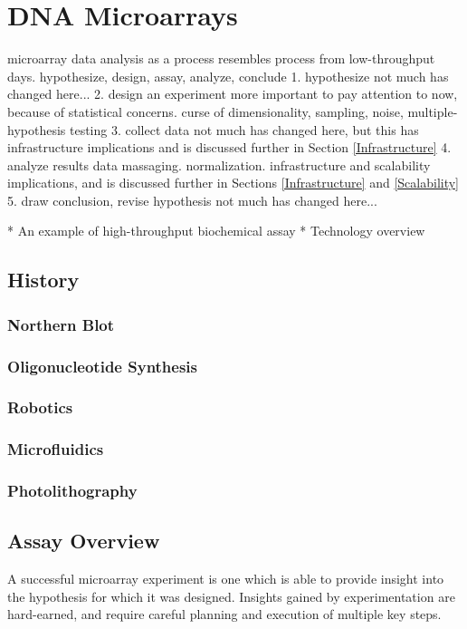 \section{DNA Microarrays}
\label{DNA Microarrays}

\newcommand{\mage}{PMID_12225585}
\newcommand{\mo}{PMID_12225585}

microarray data analysis as a process
resembles process from low-throughput days.  hypothesize, design, assay, analyze, conclude
  1. hypothesize
     not much has changed here...
  2. design an experiment
     more important to pay attention to now, because of statistical concerns.  curse of dimensionality, sampling, noise, multiple-hypothesis testing
  3. collect data
     not much has changed here, but this has infrastructure implications and is discussed further in Section \ref{Infrastructure}
  4. analyze results
     data massaging.  normalization.
     infrastructure and scalability implications, and is discussed further in Sections \ref{Infrastructure} and \ref{Scalability}
  5. draw conclusion, revise hypothesis
     not much has changed here...

* An example of high-throughput biochemical assay
* Technology overview
\subsection{History}
\label{History}
\subsubsection{Northern Blot}
\subsubsection{Oligonucleotide Synthesis}
\subsubsection{Robotics}
\subsubsection{Microfluidics}
\subsubsection{Photolithography}
\subsection{Assay Overview}
A successful microarray experiment is one which is able to provide insight into the hypothesis for which it was designed.  Insights gained by experimentation are hard-earned, and require careful planning and execution of multiple key steps.

